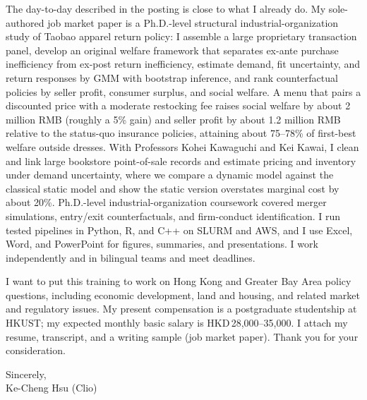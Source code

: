 \documentclass[11pt,letterpaper]{article}
\begin{document}
The day-to-day described in the posting is close to what I already do. My sole-authored job market paper is a Ph.D.-level structural industrial-organization study of Taobao apparel return policy: I assemble a large proprietary transaction panel, develop an original welfare framework that separates ex-ante purchase inefficiency from ex-post return inefficiency, estimate demand, fit uncertainty, and return responses by GMM with bootstrap inference, and rank counterfactual policies by seller profit, consumer surplus, and social welfare. A menu that pairs a discounted price with a moderate restocking fee raises social welfare by about 2 million RMB (roughly a 5\% gain) and seller profit by about 1.2 million RMB relative to the status-quo insurance policies, attaining about 75--78\% of first-best welfare outside dresses. With Professors Kohei Kawaguchi and Kei Kawai, I clean and link large bookstore point-of-sale records and estimate pricing and inventory under demand uncertainty, where we compare a dynamic model against the classical static model and show the static version overstates marginal cost by about 20\%. Ph.D.-level industrial-organization coursework covered merger simulations, entry/exit counterfactuals, and firm-conduct identification. I run tested pipelines in Python, R, and C++ on SLURM and AWS, and I use Excel, Word, and PowerPoint for figures, summaries, and presentations. I work independently and in bilingual teams and meet deadlines.

I want to put this training to work on Hong Kong and Greater Bay Area policy questions, including economic development, land and housing, and related market and regulatory issues. My present compensation is a postgraduate studentship at HKUST; my expected monthly basic salary is HKD\,28,000--35,000. I attach my resume, transcript, and a writing sample (job market paper). Thank you for your consideration.

\vspace{0.7em}
Sincerely,\\[1.0em]
Ke-Cheng Hsu (Clio)
\end{document}
